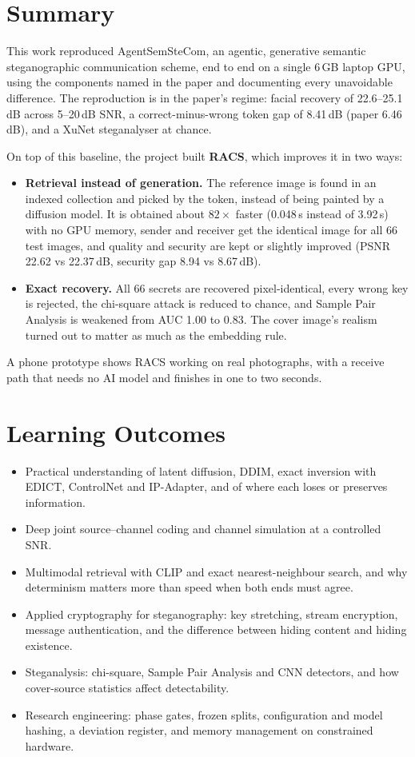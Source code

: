 \section{Summary}
This work reproduced AgentSemSteCom, an agentic, generative semantic steganographic
communication scheme, end to end on a single 6\,GB laptop GPU, using the components named in the
paper and documenting every unavoidable difference. The reproduction is in the paper's regime:
facial recovery of 22.6--25.1\,dB across 5--20\,dB SNR, a correct-minus-wrong token gap of
8.41\,dB (paper 6.46\,dB), and a XuNet steganalyser at chance.

On top of this baseline, the project built \textbf{RACS}, which improves it in two ways:
\begin{itemize}
	\item \textbf{Retrieval instead of generation.} The reference image is found in an indexed
	collection and picked by the token, instead of being painted by a diffusion model. It is
	obtained about $82\times$ faster (0.048\,s instead of 3.92\,s) with no GPU memory, sender and
	receiver get the identical image for all 66 test images, and quality and security are kept or
	slightly improved (PSNR 22.62 vs 22.37\,dB, security gap 8.94 vs 8.67\,dB).
	\item \textbf{Exact recovery.} All 66 secrets are recovered pixel-identical, every wrong key is
	rejected, the chi-square attack is reduced to chance, and Sample Pair Analysis is weakened from
	AUC 1.00 to 0.83. The cover image's realism turned out to matter as much as the embedding rule.
\end{itemize}

A phone prototype shows RACS working on real photographs, with a receive path that needs no AI
model and finishes in one to two seconds.

\section{Learning Outcomes}
\begin{itemize}
	\item Practical understanding of latent diffusion, DDIM, exact inversion with EDICT,
	ControlNet and IP-Adapter, and of where each loses or preserves information.
	\item Deep joint source--channel coding and channel simulation at a controlled SNR.
	\item Multimodal retrieval with CLIP and exact nearest-neighbour search, and why determinism
	matters more than speed when both ends must agree.
	\item Applied cryptography for steganography: key stretching, stream encryption, message
	authentication, and the difference between hiding content and hiding existence.
	\item Steganalysis: chi-square, Sample Pair Analysis and CNN detectors, and how cover-source
	statistics affect detectability.
	\item Research engineering: phase gates, frozen splits, configuration and model hashing, a
	deviation register, and memory management on constrained hardware.
\end{itemize}

